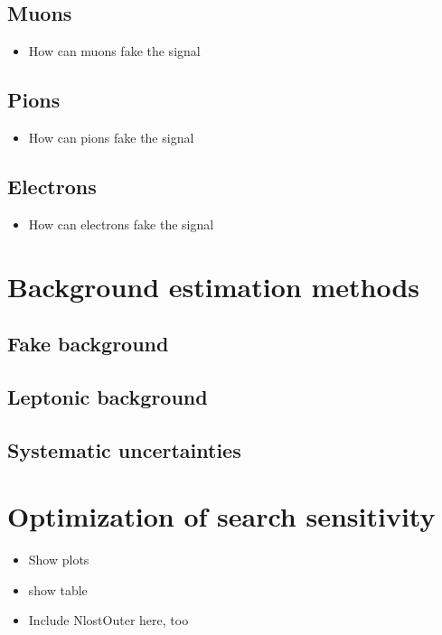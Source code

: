\subsection{Muons}
\begin{itemize}
\item How can muons fake the signal
\end{itemize}
\subsection{Pions}
\begin{itemize}
\item How can pions fake the signal
\end{itemize}
\subsection{Electrons}
\begin{itemize}
\item How can electrons fake the signal
\end{itemize}

\section{Background estimation methods}
\label{sec:BackgroundEstimation}
\subsection{Fake background}
\subsection{Leptonic background}
\subsection{Systematic uncertainties}

\section{Optimization of search sensitivity}
\label{sec:Optimization}
\begin{itemize}
\item Show plots
\item show table
\item Include NlostOuter here, too
\end{itemize}

